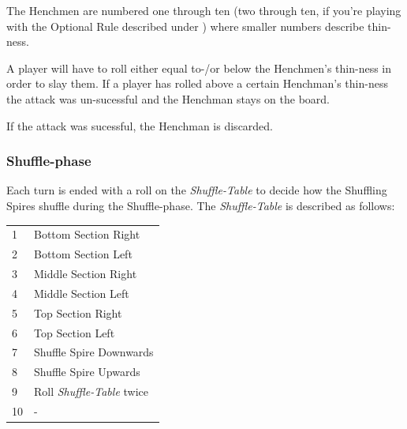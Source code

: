 \documentclass[11pt,twocolumn]{article}
\begin{document}
The Henchmen are numbered one through ten (two through ten, if you're playing with the Optional Rule described under ) where smaller numbers describe thin-ness.

A player will have to roll either equal to-/or below the Henchmen's thin-ness in order to slay them.
If a player has rolled above a certain Henchman's thin-ness the attack was un-sucessful and the Henchman stays on the board.

If the attack was sucessful, the Henchman is discarded.

\subsubsection{Shuffle-phase}
\label{sec:playingshufflespires_shufflephase}
Each turn is ended with a roll on the \textit{Shuffle-Table} to decide how the Shuffling Spires shuffle during the Shuffle-phase.
The \textit{Shuffle-Table} is described as follows:

\begin{tabular}{ l l }
	1 & Bottom Section Right \\
	2 & Bottom Section Left \\
	3 & Middle Section Right \\
	4 & Middle Section Left \\
	5 & Top Section Right \\
	6 & Top Section Left \\
	7 & Shuffle Spire Downwards\\
	8 & Shuffle Spire Upwards \\
	9 &  Roll \textit{Shuffle-Table} twice\\
	10 & - \\
\end{tabular}
\end{document}
